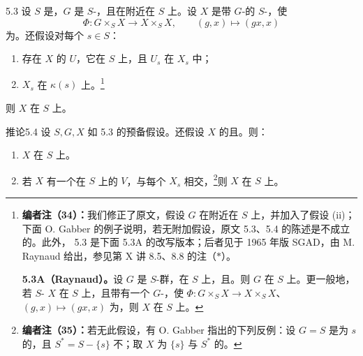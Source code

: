 \begin{SGAresult}{}{5.3}
设 $S$ 是，$G$ 是 $S$-，且在附近在 $S$ 上。设 $X$ 是带 $G$-的 $S$-，使
\[
\Phi:G\times_SX\longrightarrow X\times_SX,\qquad(g,x)\longmapsto(gx,x)
\]
为。还假设对每个 $s\in S$：
\begin{enumerate}
\item[(i)] 存在 $X$ 的 $U$，它在 $S$ 上，且 $U_s$ 在 $X_s$ 中；
\item[(ii)]  $X_s$ 在 $\kappa(s)$ 上。\footnote{\textbf{编者注（34）：}我们修正了原文，假设 $G$ 在附近在 $S$ 上，并加入了假设 (ii)；下面 O. Gabber 的例子说明，若无附加假设，原文 5.3、5.4 的陈述是不成立的。此外， 5.3 是下面 5.3A 的改写版本；后者见于 1965 年版 SGAD，由 M. Raynaud 给出，参见第 X 讲 8.5、8.8 的注（$*$）。\par\textbf{ 5.3A（Raynaud）。}设 $G$ 是 $S$-群，在 $S$ 上，且。则 $G$ 在 $S$ 上。更一般地，若 $S$- $X$ 在 $S$ 上，且带有一个 $G$-，使 $\Phi:G\times_SX\to X\times_SX$、$(g,x)\mapsto(gx,x)$ 为，则 $X$ 在 $S$ 上。}
\end{enumerate}
则 $X$ 在 $S$ 上。
\end{SGAresult}
\begin{SGAresult}{推论}{5.4}
设 $S,G,X$ 如 5.3 的预备假设。还假设 $X$ 的且。则：
\begin{enumerate}
\item[(i)] $X$ 在 $S$ 上。
\item[(ii)] 若 $X$ 有一个在 $S$ 上的 $V$，与每个 $X_s$ 相交，\footnote{\textbf{编者注（35）：}若无此假设，有 O. Gabber 指出的下列反例：设 $G=S$ 是为 $s$ 的，且 $S^*=S-\{s\}$ 不；取 $X$ 为 $\{s\}$ 与 $S^*$ 的。}则 $X$ 在 $S$ 上。
\end{enumerate}
\end{SGAresult}
